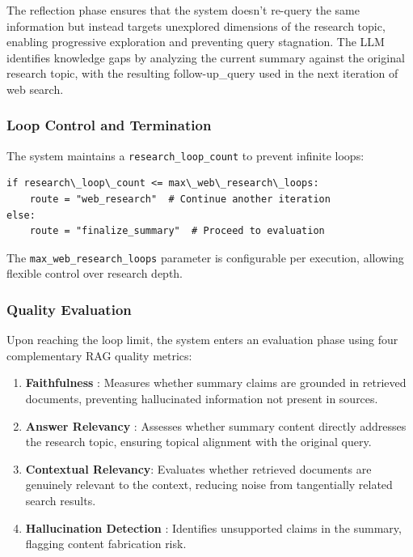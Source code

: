 The reflection phase ensures that the system doesn't re-query the same information but instead targets unexplored dimensions of the research topic, enabling progressive exploration and preventing query stagnation. The LLM identifies knowledge gaps by analyzing the current summary against the original research topic, with the resulting follow-up\_query used in the next iteration of web search.

\subsubsection{Loop Control and Termination}

The system maintains a \texttt{research\_loop\_count} to prevent infinite loops:

\begin{lstlisting}
if research\_loop\_count <= max\_web\_research\_loops:
    route = "web_research"  # Continue another iteration
else:
    route = "finalize_summary"  # Proceed to evaluation
\end{lstlisting}

The \texttt{max\_web\_research\_loops} parameter is configurable per execution, allowing flexible control over research depth.

\subsubsection{Quality Evaluation}

Upon reaching the loop limit, the system enters an evaluation phase using four complementary RAG quality metrics:

\begin{enumerate}
    \item \textbf{Faithfulness} : Measures whether summary claims are grounded in retrieved documents, preventing hallucinated information not present in sources.
    
    \item \textbf{Answer Relevancy} : Assesses whether summary content directly addresses the research topic, ensuring topical alignment with the original query.
    
    \item \textbf{Contextual Relevancy}: Evaluates whether retrieved documents are genuinely relevant to the context, reducing noise from tangentially related search results.
    
    \item \textbf{Hallucination Detection} : Identifies unsupported claims in the summary, flagging content fabrication risk.
\end{enumerate}


